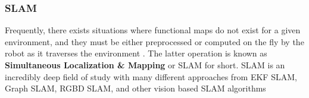 





\subsubsection{SLAM}
Frequently, there exists situations where functional maps do not exist for a given environment, and they must be either preprocessed or computed on the fly by the robot as it traverses the environment \cite{thrun2005probabilistic}. The latter operation is known as \textbf{Simultaneous Localization \& Mapping} or SLAM for short. SLAM is an incredibly deep field of study with many different approaches from EKF SLAM, Graph SLAM, RGBD SLAM, and other vision based SLAM algorithms

